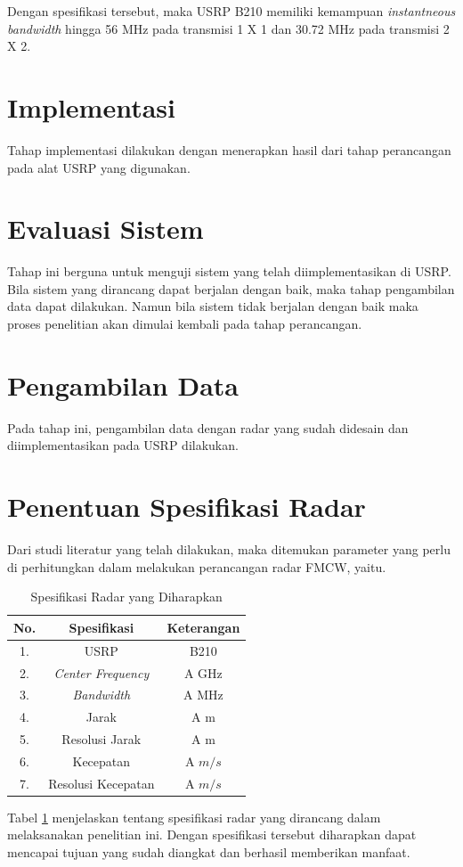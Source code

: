 Dengan spesifikasi tersebut, maka USRP B210 memiliki kemampuan \textit{instantneous bandwidth} hingga 56 MHz pada transmisi 1 X 1 dan 30.72 MHz pada transmisi 2 X 2.

\section{Implementasi}
Tahap implementasi dilakukan dengan menerapkan hasil dari tahap perancangan pada alat USRP yang digunakan. 

\section{Evaluasi Sistem}
Tahap ini berguna untuk menguji sistem yang telah diimplementasikan di USRP. Bila sistem yang dirancang dapat berjalan dengan baik, maka tahap pengambilan data dapat dilakukan. Namun bila sistem tidak berjalan dengan baik maka proses penelitian akan dimulai kembali pada tahap perancangan.
	
\section{Pengambilan Data}
Pada tahap ini, pengambilan data dengan radar yang sudah didesain dan diimplementasikan pada USRP dilakukan.

\section{Penentuan Spesifikasi Radar}
Dari studi literatur yang telah dilakukan, maka ditemukan parameter yang perlu di perhitungkan dalam melakukan perancangan radar FMCW, yaitu.
\begin{center}
\begin{longtable}{| c | c | c |}
	\caption[Spesifikasi Radar]{Spesifikasi Radar yang Diharapkan}
	\label{tab:spekRadar}\\
	\hline
	No. & Spesifikasi & Keterangan\\
	\hline
	1. & USRP & B210\\
	2. & \textit{Center Frequency} & A GHz \\
	3. & \textit{Bandwidth} & A MHz \\
	4. & Jarak & A m \\
	5. & Resolusi Jarak & A m \\
	6.& Kecepatan & A $m/s$ \\
	7. & Resolusi Kecepatan & A $m/s$\\
	\hline
\end{longtable}
\end{center}

Tabel \ref{tab:spekRadar} menjelaskan tentang spesifikasi radar yang dirancang dalam melaksanakan penelitian ini. Dengan spesifikasi tersebut diharapkan dapat mencapai tujuan yang sudah diangkat dan berhasil memberikan manfaat.